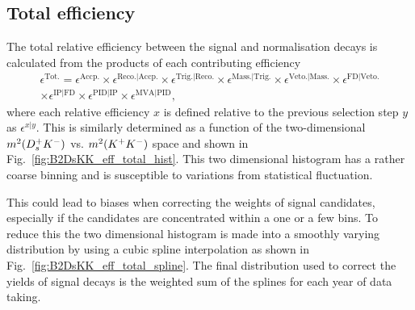 \subsection{Total efficiency}
The total relative efficiency between the signal and normalisation decays is calculated from the products of each contributing efficiency
\begin{multline}
\epsilon^\text{Tot.} = \epsilon^{\text{Accp.}} \times \epsilon^{\text{Reco.}|\text{Accp.}} \times \epsilon^{\text{Trig.}|\text{Reco.}}\times \epsilon^{\text{Mass.}|\text{Trig.}}\times \epsilon^{\text{Veto.}|\text{Mass.}}\times \epsilon^{\text{FD}|\text{Veto.}}\\
\times \epsilon^{\text{IP}|\text{FD}} \times \epsilon^{\text{PID}|\text{IP}} \times \epsilon^{\text{MVA}|\text{PID}},
\label{eq:B2DsPhi_eff_eq}
\end{multline}
where each relative efficiency $x$ is defined relative to the previous selection step $y$ as $\epsilon^{x|y}$. This is similarly determined as a function of the two-dimensional $m^{2}({{D}^+_{s}}{{K}^-})$ vs. $m^{2}({{K}^+}{{K}^-})$ space and shown in Fig.~\ref{fig:B2DsKK_eff_total_hist}. This two dimensional histogram has a rather coarse binning and is susceptible to variations from statistical fluctuation.  

This could lead to biases when correcting the weights of signal candidates, especially if the candidates are concentrated within a one or a few bins. To reduce this the two dimensional histogram is made into a smoothly varying distribution by using a cubic spline interpolation as shown in Fig.~\ref{fig:B2DsKK_eff_total_spline}. The final distribution used to correct the yields of signal decays is the weighted sum of the splines for each year of data taking.


